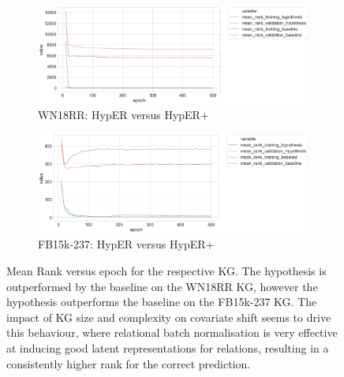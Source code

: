 
\begin{figure}[H]
	\begin{subfigure}[b]{.5\linewidth}
   		\centering
    		\includegraphics[width=1.0\linewidth, height=0.6\linewidth]{WN18RR_mean_rank_Results}
		\captionsetup{justification=centering}
		\caption{WN18RR: HypER versus HypER+}
	\end{subfigure}
	\begin{subfigure}[b]{.5\linewidth}
   		\centering
		\includegraphics[width=1.0\linewidth, height=0.6\linewidth]{FB15k-237_mean_rank_Results}
		\captionsetup{justification=centering}
		\caption{FB15k-237: HypER versus HypER+}
	\end{subfigure}
	\caption{Mean Rank versus epoch for the respective KG. The hypothesis is outperformed by the baseline on the WN18RR KG, however the hypothesis outperforms the baseline on the FB15k-237 KG. The impact of KG size and complexity on covariate shift seems to drive this behaviour, where relational batch normalisation is very effective at inducing good latent representations for relations, resulting in a consistently higher rank for the correct prediction.}
\end{figure}

